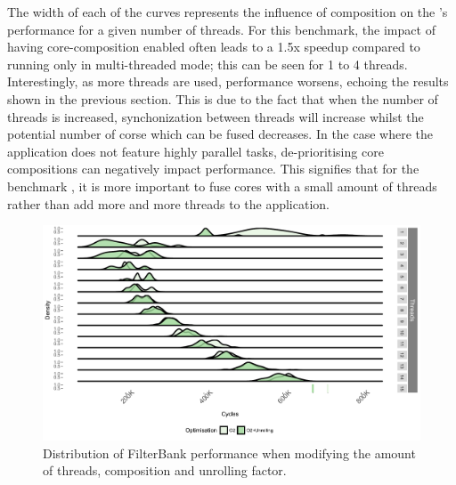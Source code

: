 The width of each of the curves represents the influence of composition on the 's performance for a given number of threads.
For this benchmark, the impact of having core-composition enabled often leads to a 1.5x speedup compared to running only in multi-threaded mode; this can be seen for 1 to 4 threads.
Interestingly, as more threads are used, performance worsens, echoing the results shown in the previous section.
This is due to the fact that when the number of threads is increased, synchonization between threads will increase whilst the potential number of corse which can be fused decreases.
In the case where the application does not feature highly parallel tasks, de-prioritising core compositions can negatively impact performance.
This signifies that for the benchmark , it is more important to fuse cores with a small amount of threads rather than add more and more threads to the application.


\begin{figure}[t]
  \includegraphics[width=1\textwidth]{streamit-paper/graphics/filterbank_unroll.pdf}
  \caption{Distribution of FilterBank performance when modifying the amount of threads, composition and unrolling factor.}\label{fig:fbunroll}
\end{figure}


